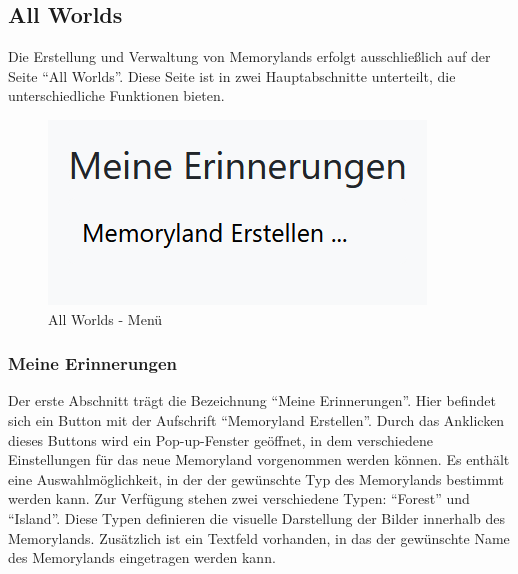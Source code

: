 \subsection{All Worlds}

Die Erstellung und Verwaltung von Memorylands erfolgt ausschlie\ss{}lich auf der Seite 
``All Worlds''. Diese Seite ist in zwei Hauptabschnitte unterteilt, die 
unterschiedliche Funktionen bieten.

\begin{figure}
    \centering
    \includegraphics[scale=0.7]{pics/all_worlds_teil1.PNG}
    \caption{All Worlds - Menü}
    \label{fig:all-worlds-menu}
\end{figure}

\subsubsection{Meine Erinnerungen}

Der erste Abschnitt trägt die Bezeichnung ``Meine Erinnerungen''. Hier befindet 
sich ein Button mit der Aufschrift ``Memoryland Erstellen''. Durch das Anklicken 
dieses Buttons wird ein Pop-up-Fenster geöffnet, in dem verschiedene Einstellungen 
für das neue Memoryland vorgenommen werden können. Es enthält eine Auswahlmöglichkeit, 
in der der gewünschte Typ des Memorylands bestimmt werden kann. Zur Verfügung stehen 
zwei verschiedene Typen: ``Forest'' und ``Island''. Diese Typen definieren die 
visuelle Darstellung der Bilder innerhalb des Memorylands. Zusätzlich ist ein 
Textfeld vorhanden, in das der gewünschte Name des Memorylands eingetragen werden 
kann.

